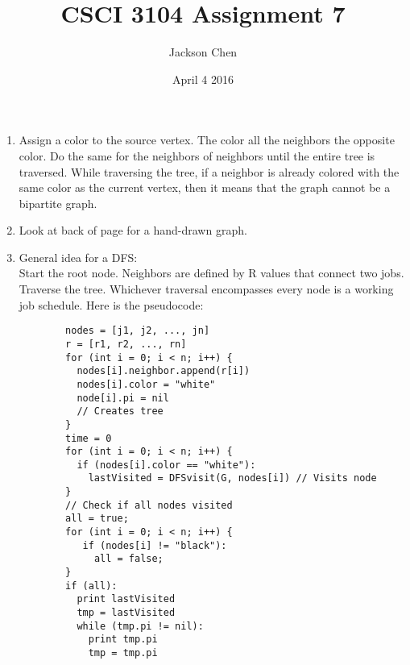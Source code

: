 \documentclass[11pt, letterpaper]{article}
\newcommand{\subtitle}[1]{
  \posttitle{
    \par\end{center}
    \begin{center}\large#1\end{center}
    \vskip0.5em}
}
\begin{document}
  \title{CSCI 3104 Assignment 7}
    \subtitle{10:00 - 10:50 Wanshan}
    \date{April 4 2016}
    \author{Jackson Chen}
    \maketitle

  \begin{enumerate}
    \item
      Assign a color to the source vertex. The color all the neighbors the opposite color.
      Do the same for the neighbors of neighbors until the entire tree is traversed. While traversing
      the tree, if a neighbor is already colored with the same color as the current vertex, then it means
      that the graph cannot be a bipartite graph.
    \item
      Look at back of page for a hand-drawn graph.
    \item
      General idea for a DFS: \\
      Start the root node. Neighbors are defined by R values that connect two jobs. Traverse the tree. Whichever traversal
      encompasses every node is a working job schedule. Here is the pseudocode:
      \begin{lstlisting}
        nodes = [j1, j2, ..., jn]
        r = [r1, r2, ..., rn]
        for (int i = 0; i < n; i++) {
          nodes[i].neighbor.append(r[i])
          nodes[i].color = "white"
          node[i].pi = nil
          // Creates tree
        }
        time = 0
        for (int i = 0; i < n; i++) {
          if (nodes[i].color == "white"):
            lastVisited = DFSvisit(G, nodes[i]) // Visits node
        }
        // Check if all nodes visited
        all = true;
        for (int i = 0; i < n; i++) {
           if (nodes[i] != "black"):
             all = false;
        }
        if (all):
          print lastVisited
          tmp = lastVisited
          while (tmp.pi != nil):
            print tmp.pi
            tmp = tmp.pi
      \end{lstlisting}
  \end{enumerate}
\end{document}
